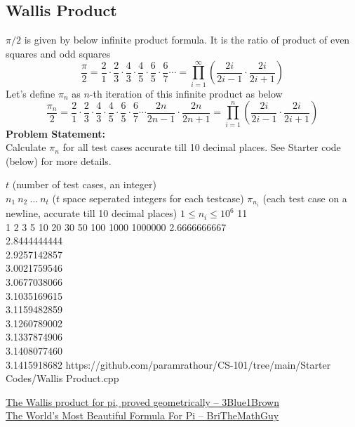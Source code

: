 \subsection{Wallis Product}{\label{pp:wallis}}
$\pi/2$ is given by below infinite product formula. It is the ratio of product of even squares and odd squares
\begin{equation}
\frac{\pi}{2} = {\frac {2}{1}}\cdot {\frac {2}{3}}\cdot {\frac {4}{3}}\cdot {\frac {4}{5}}\cdot {\frac {6}{5}}\cdot {\frac {6}{7}}\cdots= \prod _{i=1}^{\infty}\left({\frac {2i}{2i-1}}\cdot {\frac {2i}{2i+1}}\right)
\end{equation}
Let's define $\pi_n$ as $n$-th iteration of this infinite product as below
\begin{equation*}
\frac{\pi_n}{2} = {\frac {2}{1}}\cdot {\frac {2}{3}}\cdot {\frac {4}{3}}\cdot {\frac {4}{5}}\cdot {\frac {6}{5}}\cdot {\frac {6}{7}}\cdots{\frac {2n}{2n-1}}\cdot {\frac {2n}{2n+1}} = \prod _{i=1}^{n}\left({\frac {2i}{2i-1}}\cdot {\frac {2i}{2i+1}}\right)
\end{equation*}
\textbf{Problem Statement:}\\
Calculate $\pi_n$ for all test cases accurate till 10 decimal places. See Starter code (below) for more details.
\begin{testcases}
	{$t$ \hfill(number of test cases, an integer)\\$n_1\ n_2\ \ldots\ n_t$ \hfill($t$ space seperated integers for each testcase)}
	{$\pi_{n_i}$ \hfill(each test case on a newline, accurate till 10 decimal places)}
	{$1 \leq n_i \leq 10^{6}$}
	{11\\1 2 3 5 10 20 30 50 100 1000 1000000}
	{2.6666666667\\2.8444444444\\2.9257142857\\3.0021759546\\3.0677038066\\3.1035169615\\3.1159482859\\3.1260789002\\3.1337874906\\3.1408077460\\3.1415918682}
	{https://github.com/paramrathour/CS-101/tree/main/Starter Codes/Wallis Product.cpp}
\end{testcases}
\begin{funvideo}
\href{https://youtu.be/8GPy_UMV-08}{The Wallis product for pi, proved geometrically -- 3Blue1Brown}\\
\href{https://youtu.be/k9nRlMDbefc}{The World's Most Beautiful Formula For Pi -- BriTheMathGuy}
\end{funvideo}